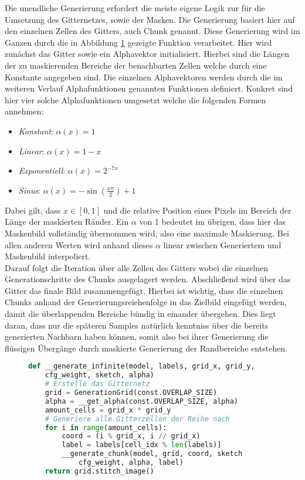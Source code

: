 Die unendliche Generierung erfordert die meiste eigene Logik zur für die Umsetzung des Gitternetzes, sowie der Masken. Die Generierung basiert hier auf den einzelnen Zellen des Gitters, auch Chunk genannt. Diese Generierung wird im Ganzen durch die in Abbildung \ref{fig:gen_infinite} gezeigte Funktion verarbeitet. Hier wird zunächst das Gitter sowie ein Alphavektor initialisiert. Hierbei sind die Längen der zu maskierenden Bereiche der benachbarten Zellen welche durch eine Konstante angegeben sind. Die einzelnen Alphavektoren werden durch die im weiteren Verlauf Alphafunktionen genannten Funktionen definiert. Konkret sind hier vier solche Alphafunktionen umgesetzt welche die folgenden Formen annehmen: 
\begin{itemize}
    \item \textit{Konstant}: $\alpha(x) = 1$
    \item \textit{Linear}: $\alpha(x) = 1 - x$
    \item \textit{Exponentiell}: $\alpha(x) = 2^{-7x}$
    \item \textit{Sinus}: $\alpha(x) = -\sin(\frac{x\pi}{2}) + 1$
\end{itemize}
Dabei gilt, dass $x \in [0,1]$ und die relative Position eines Pixels im Bereich der Länge der maskierten Ränder. Ein $\alpha$ von 1 bedeutet im übrigen, dass hier das Maskenbild vollständig übernommen wird, also eine maximale Maskierung. Bei allen anderen Werten wird anhand dieses $\alpha$ linear zwischen Generiertem und Maskenbild interpoliert. \\
Darauf folgt die Iteration über alle Zellen des Gitters wobei die einzelnen Generationschritte des Chunks ausgelagert werden. Abschließend wird über das Gitter das finale Bild zusammengefügt. Hierbei ist wichtig, dass die einzelnen Chunks anhand der Generierungsreiehenfolge in das Zielbild eingefügt werden, damit die überlappenden Bereiche bündig in einander übergehen. Dies liegt daran, dass nur die späteren Samples natürlich kenntniss über die bereits generierten Nachbarn haben können, somit also bei ihrer Generierung die flüssigen Übergänge durch maskierte Generierung der Randbereiche entstehen. 
\begin{figure}[htbp]
\begin{lstlisting}[language=python]
def __generate_infinite(model, labels, grid_x, grid_y,
    cfg_weight, sketch, alpha)
    # Erstelle das Gitternetz
    grid = GenerationGrid(const.OVERLAP_SIZE)
    alpha = __get_alpha(const.OVERLAP_SIZE, alpha)
    amount_cells = grid_x * grid_y
    # Generiere alle Gitterzellen der Reihe nach
    for i in range(amount_cells):
        coord = (i % grid_x, i // grid_x)
        label = labels[cell_idx % len(labels)]
        __generate_chunk(model, grid, coord, sketch
            cfg_weight, alpha, label)
    return grid.stitch_image()
\end{lstlisting}
    \captionsetup{type=figure}
    \label{fig:gen_infinite}
\end{figure} \\
